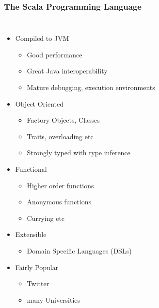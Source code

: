\documentclass[xcolor=pdflatex,dvipsnames,table]{beamer}
\begin{document}
\begin{frame}[fragile]
\frametitle{The Scala Programming Language}

\begin{columns}[c]


\begin{itemize}
\item Compiled to JVM
\begin{itemize}
\item Good performance
\item Great Java interoperability
\item Mature debugging, execution environments
\end{itemize}
\item Object Oriented
\begin{itemize}
\item Factory Objects, Classes
\item Traits, overloading etc
\item Strongly typed with type inference
\end{itemize}
\item Functional
\begin{itemize}
\item Higher order functions
\item Anonymous functions
\item Currying etc
\end{itemize}
\item Extensible
\begin{itemize}
\item Domain Specific Languages (DSLs)
\end{itemize}
\item Fairly Popular
\begin{itemize}
\item Twitter
\item many Universities
\end{itemize}
\end{itemize}



\end{columns}
\end{frame}
\end{document}
